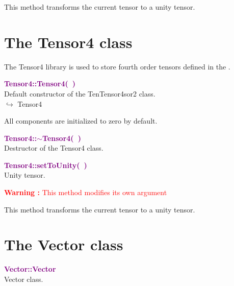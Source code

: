 This method transforms the current tensor to a unity tensor.

\section{The Tensor4 class}

The Tensor4 library is used to store fourth order tensors defined in the \DynELA.

\textcolor{purple}{\textbf{Tensor4::Tensor4(~)}}\label{Tensor4::Tensor4()}\\
Default constructor of the TenTensor4sor2 class.\\ \hspace*{10mm}$\hookrightarrow$ Tensor4

All components are initialized to zero by default.

\textcolor{purple}{\textbf{Tensor4::$\sim$Tensor4(~)}}\label{Tensor4::~Tensor4()}\\
Destructor of the Tensor4 class.


\textcolor{purple}{\textbf{Tensor4::setToUnity(~)}}\label{Tensor4::setToUnity()}\\
Unity tensor.

\hspace*{10mm}\textcolor{red}{\textbf{Warning :} This method modifies its own argument}

This method transforms the current tensor to a unity tensor.

\section{The Vector class}

\textcolor{purple}{\textbf{Vector::Vector}}\label{Vector::Vector}\\
Vector class.

